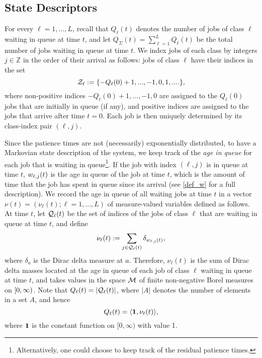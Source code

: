 \documentclass{article}
\theoremstyle{definition}
\numberwithin{equation}{section}
\begin{document}
\subsection{State Descriptors} \label{sec_state}
For every $\ell=1,...,L$, recall that $Q_\ell(t)$ denotes the number of jobs of class $\ell$ waiting in queue at time $t$, and let $Q_\Sigma(t)=\sum_{\ell=1}^LQ_\ell(t)$ be the total number of jobs waiting in queue at time $t$. We index jobs of each class by integers $j\in\mathbb{Z}$ in the order of their arrival as follows: jobs of class $\ell$ have their indices in the set
\[
\mathcal{Z}_\ell := \{-Q_\ell(0)+1,...,-1,0,1,....\},
\]
where non-positive indices $-Q_\ell(0)+1,...,-1,0$ are assigned to the $Q_\ell(0)$ jobs that are initially in queue (if any), and positive indices are assigned to the jobs that arrive after time $t=0$. Each job is then uniquely determined by its class-index pair $(\ell,j)$. 

Since the patience times are not (necessarily) exponentially distributed, to have a Markovian state description of the system, we keep track of the \textit{age in queue} for each job that is waiting in queue\footnote{Alternatively, one could choose to keep track of the residual patience times.}. If the job with index $(\ell,j)$ is in queue at time $t$,  $w_{\ell,j}(t)$ is the age in queue of the job at time $t$, which is the amount of time that the job has spent in queue since its arrival (see \eqref{def_w} for a full description). We record the age in queue of all waiting jobs at time $t$ in a vector $\nu(t)=(\nu_\ell(t);\ell=1,...,L)$ of measure-valued variables defined as follows. At time $t$, let $\mathcal{Q}_\ell(t)$ be the set of indices of the jobs of class $\ell$ that are waiting in queue at time $t$,  and define
\begin{equation}\label{def_nuk_early}
  \nu_\ell(t):= \sum_{j\in\mathcal{Q}_\ell(t)}\delta_{w_{\ell,j}(t)},
\end{equation}
where $\delta_a$ is the Dirac delta measure at $a$. Therefore, $\nu_\ell(t)$ is the sum of Dirac delta masses located at the age in queue of each job of class $\ell$ waiting in queue at time $t$, and takes values in the space $\mathcal{M}$ of finite non-negative Borel measures on $[0,\infty)$. Note that $Q_\ell(t)=|\mathcal{Q}_\ell(t)|$, where $|A|$ denotes the number of elements in a set $A$, and hence
\begin{equation}
  \ql_\ell(t)=\langle\f1,\nu_\ell(t)\rangle,
\end{equation}
where $\f1$ is the constant function on $[0,\infty)$ with value 1.
\end{document}
